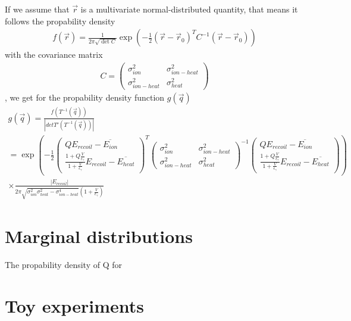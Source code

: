\documentclass[10pt, a4paper]{article}
\begin{document}
If we assume that $\vec{r}$ is a multivariate normal-distributed quantity, that means it follows the propability density
\begin{gather}
f(\vec{r}) = \frac{1}{2 \pi \sqrt{\det C}} \exp \left( - \frac{1}{2} (\vec{r} - \vec{r}_0)^T C^{-1} (\vec{r} - \vec{r}_0) \right)
\end{gather}
with the covariance matrix
\begin{gather}
C = \begin{pmatrix} \sigma_{ion}^2 & \sigma_{ion-heat}^2 \\ \sigma_{ion-heat}^2 & \sigma_{heat}^2 \end{pmatrix}
\end{gather}
, we get for the propability density function $g(\vec{q})$
\begin{gather}
g(\vec{q}) = \frac{f(T^{-1}(\vec{q}))}{\left| det T'(T^{-1}(\vec{q})) \right|} \\ =  \exp \left( - \frac{1}{2}  \begin{pmatrix} Q E_{recoil} - \overline{E_{ion}}\\ \frac{1 + Q \frac{V}{\epsilon_\gamma}}{1 + \frac{V}{\epsilon_\gamma}} E_{recoil} - \overline{E_{heat}} \end{pmatrix}^T \begin{pmatrix} \sigma_{ion}^2 & \sigma_{ion-heat}^2 \\ \sigma_{ion-heat}^2 & \sigma_{heat}^2 \end{pmatrix}^{-1} \begin{pmatrix} Q E_{recoil} - \overline{E_{ion}} \\ \frac{1 + Q \frac{V}{\epsilon_\gamma}}{1 + \frac{V}{\epsilon_\gamma}} E_{recoil} - \overline{E_{heat}} \end{pmatrix} \right) \\
\times  \frac{\left| E_{recoil} \right| }{2 \pi \sqrt{\sigma_{ion}^2 \sigma_{heat}^2 - \sigma_{ion-heat}^4} \left(1 + \frac{V}{\epsilon_\gamma}\right)}
\end{gather}
\section{Marginal distributions}
The propability density of Q for 


\section{Toy experiments}
\end{document}
